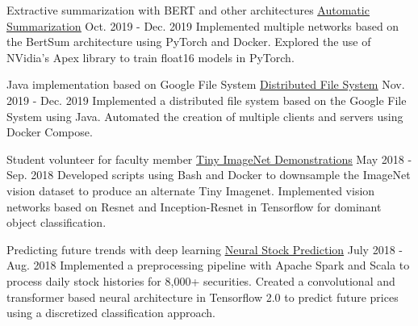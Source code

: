 

\begin{cventries}

  \cventry
  	{Extractive summarization with BERT and other architectures} %
		{
			\href{https://github.com/TidalPaladin/neural-summarizer}
      {\underline{Automatic Summarization}}
		} %
  	{Oct. 2019 - Dec. 2019} %
    {} %
	{
    Implemented multiple networks based on the BertSum architecture using PyTorch 
    and Docker. Explored the use of NVidia's Apex library to train float16 models 
    in PyTorch.
	}

  \cventry
  	{Java implementation based on Google File System} %
		{
			\href{https://github.com/TidalPaladin/distributed-fs}
      {\underline{Distributed File System}}
		} %
  	{Nov. 2019 - Dec. 2019} %
    {} %
	{
    Implemented a distributed file system based on the Google File System using
    Java. Automated the creation of multiple clients and servers using 
    Docker Compose.
	}

  \cventry
  	{Student volunteer for faculty member} %
		{
			\href{https://github.com/TidalPaladin/tiny-imagenet-demo}
      {\underline{Tiny ImageNet Demonstrations}}
		} %
  	{May 2018 - Sep. 2018} %
    {} %
	{
		Developed scripts using Bash and Docker to downsample
		the ImageNet vision dataset to produce an alternate Tiny Imagenet.
		Implemented vision networks based on Resnet and
		Inception-Resnet in Tensorflow for dominant object
		classification.
	}

  \cventry
  	{Predicting future trends with deep learning} %
		{
			\href{https://github.com/TidalPaladin/trader}
      {\underline{Neural Stock Prediction}}
		} %
  	{July 2018 - Aug. 2018} %
    {} %
	{
		Implemented a preprocessing pipeline with Apache Spark and Scala
		to process daily stock histories for 8,000+ securities.
		Created a convolutional and transformer based neural architecture
		in Tensorflow 2.0 to predict future prices using a discretized
		classification approach.
	}

\end{cventries}
